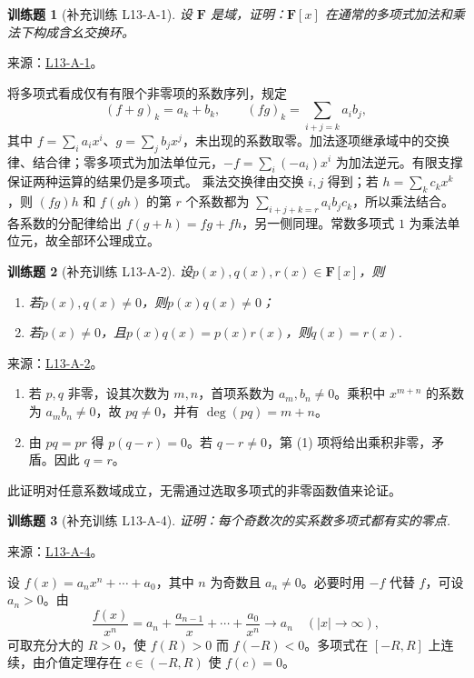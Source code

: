 \documentclass[12pt,fontset=fandol]{ctexart}
\newtheorem{exercise}{训练题}[section]
\begin{document}
\begin{exercise}[补充训练 L13-A-1]\label{prob:L13-A-1}
设 $\mathbf F$ 是域，证明：$\mathbf F[x]$ 在通常的多项式加法和乘法下构成含幺交换环。
\end{exercise}
\noindent 来源：\href{https://github.com/yhwu-is/Linear-Algebra-Left-Undone/blob/new/%E8%AE%B2%E4%B9%89/%E4%B8%93%E9%A2%98/13%20%E5%A4%9A%E9%A1%B9%E5%BC%8F.tex}{L13-A-1}。
\begin{solve}
将多项式看成仅有有限个非零项的系数序列，规定
\[(f+g)_k=a_k+b_k,\qquad(fg)_k=\sum_{i+j=k}a_ib_j,\]
其中 $f=\sum_ia_ix^i$、$g=\sum_jb_jx^j$，未出现的系数取零。加法逐项继承域中的交换律、结合律；零多项式为加法单位元，$-f=\sum_i(-a_i)x^i$ 为加法逆元。有限支撑保证两种运算的结果仍是多项式。
乘法交换律由交换 $i,j$ 得到；若 $h=\sum_kc_kx^k$，则 $(fg)h$ 和 $f(gh)$ 的第 $r$ 个系数都为 $\sum_{i+j+k=r}a_ib_jc_k$，所以乘法结合。各系数的分配律给出 $f(g+h)=fg+fh$，另一侧同理。常数多项式 $1$ 为乘法单位元，故全部环公理成立。
\end{solve}

\begin{exercise}[补充训练 L13-A-2]\label{prob:L13-A-2}
设$p(x),q(x),r(x)\in\mathbf{F}[x]$，则
        \begin{enumerate}
            \item 若$p(x),q(x)\neq 0$，则$p(x)q(x)\neq 0$；
            \item 若$p(x)\neq 0$，且$p(x)q(x)=p(x)r(x)$，则$q(x)=r(x)$.
        \end{enumerate}
\end{exercise}
\noindent 来源：\href{https://github.com/yhwu-is/Linear-Algebra-Left-Undone/blob/new/%E8%AE%B2%E4%B9%89/%E4%B8%93%E9%A2%98/13%20%E5%A4%9A%E9%A1%B9%E5%BC%8F.tex}{L13-A-2}。
\begin{solve}
\begin{enumerate}
\item 若 $p,q$ 非零，设其次数为 $m,n$，首项系数为 $a_m,b_n\ne0$。乘积中 $x^{m+n}$ 的系数为 $a_mb_n\ne0$，故 $pq\ne0$，并有 $\deg(pq)=m+n$。
\item 由 $pq=pr$ 得 $p(q-r)=0$。若 $q-r\ne0$，第 (1) 项将给出乘积非零，矛盾。因此 $q=r$。
\end{enumerate}
此证明对任意系数域成立，无需通过选取多项式的非零函数值来论证。
\end{solve}

\begin{exercise}[补充训练 L13-A-4]\label{prob:L13-A-4}
证明：每个奇数次的实系数多项式都有实的零点.
\end{exercise}
\noindent 来源：\href{https://github.com/yhwu-is/Linear-Algebra-Left-Undone/blob/new/%E8%AE%B2%E4%B9%89/%E4%B8%93%E9%A2%98/13%20%E5%A4%9A%E9%A1%B9%E5%BC%8F.tex}{L13-A-4}。
\begin{solve}
设 $f(x)=a_nx^n+\cdots+a_0$，其中 $n$ 为奇数且 $a_n\ne0$。必要时用 $-f$ 代替 $f$，可设 $a_n>0$。由
\[\frac{f(x)}{x^n}=a_n+\frac{a_{n-1}}x+\cdots+\frac{a_0}{x^n}\longrightarrow a_n\quad(|x|\to\infty),\]
可取充分大的 $R>0$，使 $f(R)>0$ 而 $f(-R)<0$。多项式在 $[-R,R]$ 上连续，由介值定理存在 $c\in(-R,R)$ 使 $f(c)=0$。
\end{solve}
\end{document}
